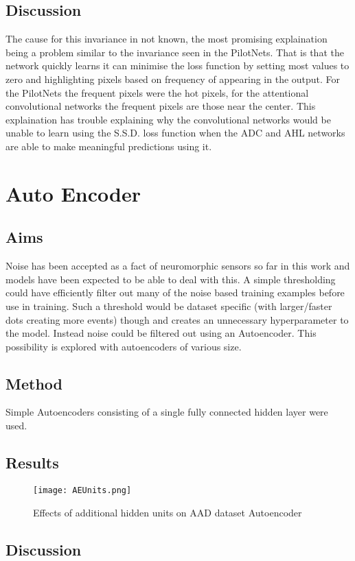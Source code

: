 \subsection{Discussion}
The cause for this invariance in not known, the most promising explaination being a problem similar to the invariance seen in the PilotNets.
That is that the network quickly learns it can minimise the loss function by setting most values to zero and highlighting pixels based on frequency of appearing in the output.
For the PilotNets the frequent pixels were the hot pixels, for the attentional convolutional networks the frequent pixels are those near the center.
This explaination has trouble explaining why the convolutional networks would be unable to learn using the S.S.D. loss function when the ADC and AHL networks are able to make meaningful predictions using it.  

\section{Auto Encoder}
\subsection{Aims}
Noise has been accepted as a fact of neuromorphic sensors so far in this work and models have been expected to be able to deal with this.
A simple thresholding could have efficiently filter out many of the noise based training examples before use in training. 
Such a threshold would be dataset specific (with larger/faster dots creating more events) though and creates an unnecessary hyperparameter to the model. 
Instead noise could be filtered out using an Autoencoder.
This possibility is explored with autoencoders of various size.

\subsection{Method}
Simple Autoencoders consisting of a single fully connected hidden layer were used. 

\subsection{Results}

\begin{figure}[h]
    \centering
    \texttt{[image: AEUnits.png]}
    \caption{Effects of additional hidden units on AAD dataset Autoencoder}
    \label{fig:AEUnits}
\end{figure}


\subsection{Discussion}
 
